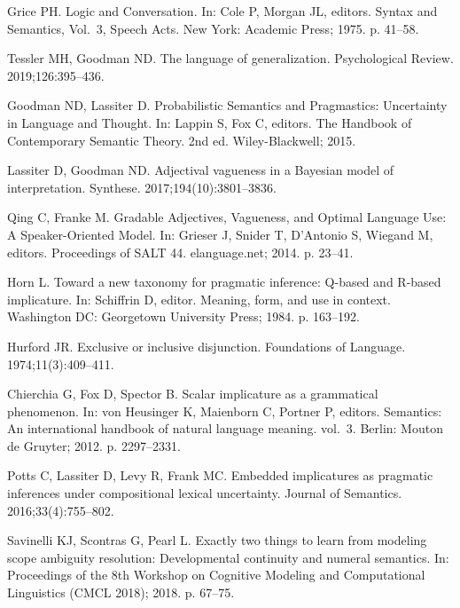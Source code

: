 \documentclass[10pt,letterpaper]{article}
\begin{document}
\begin{thebibliography}{10}
Grice PH.
\newblock Logic and Conversation.
\newblock In: Cole P, Morgan JL, editors. Syntax and Semantics, Vol.~3, Speech
  Acts. New York: Academic Press; 1975. p. 41--58.

Tessler MH, Goodman ND.
\newblock The language of generalization.
\newblock Psychological Review. 2019;126:395--436.

Goodman ND, Lassiter D.
\newblock Probabilistic Semantics and Pragmastics: Uncertainty in Language and
  Thought.
\newblock In: Lappin S, Fox C, editors. The Handbook of Contemporary Semantic
  Theory. 2nd ed. Wiley-Blackwell; 2015.

Lassiter D, Goodman ND.
\newblock Adjectival vagueness in a Bayesian model of interpretation.
\newblock Synthese. 2017;194(10):3801--3836.

Qing C, Franke M.
\newblock Gradable Adjectives, Vagueness, and Optimal Language Use: {A}
  Speaker-Oriented Model.
\newblock In: Grieser J, Snider T, D'Antonio S, Wiegand M, editors. Proceedings
  of {SALT} 44. elanguage.net; 2014. p. 23--41.

Horn L.
\newblock Toward a new taxonomy for pragmatic inference: {Q}-based and
  {R}-based implicature.
\newblock In: Schiffrin D, editor. Meaning, form, and use in context.
  Washington DC: Georgetown University Press; 1984. p. 163--192.

Hurford JR.
\newblock Exclusive or inclusive disjunction.
\newblock Foundations of Language. 1974;11(3):409--411.

Chierchia G, Fox D, Spector B.
\newblock Scalar implicature as a grammatical phenomenon.
\newblock In: von Heusinger K, Maienborn C, Portner P, editors. Semantics: An
  international handbook of natural language meaning. vol.~3. Berlin: Mouton de
  Gruyter; 2012. p. 2297--2331.

Potts C, Lassiter D, Levy R, Frank MC.
\newblock Embedded implicatures as pragmatic inferences under compositional
  lexical uncertainty.
\newblock Journal of Semantics. 2016;33(4):755--802.

Savinelli KJ, Scontras G, Pearl L.
\newblock Exactly two things to learn from modeling scope ambiguity resolution:
  Developmental continuity and numeral semantics.
\newblock In: Proceedings of the 8th Workshop on Cognitive Modeling and
  Computational Linguistics ({CMCL} 2018); 2018. p. 67--75.


\end{thebibliography}
\end{document}
